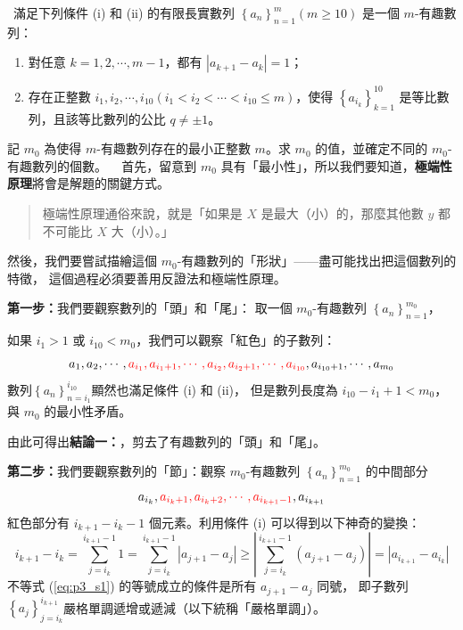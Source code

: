 \documentclass{article}
\newcommand{\INDEX}[1]{\fbox{\textbf{#1}}\ }
\begin{document}
\newpage
\INDEX{問題3}滿足下列條件 (i) 和 (ii) 的有限長實數列 $\left\{a_n\right\}_{n=1}^{m}\left(m\geq10\right)$ 是一個 $m$-有趣數列：
\begin{enumerate}[label = (\roman*)]
  \item 對任意 $k=1,2,\cdots,m-1$，都有 $\left|a_{k+1}-a_k\right|=1$；
  \item 存在正整數 $i_1,i_2,\cdots,i_{10}\left(i_1<i_2<\cdots<i_{10}\leq m\right)$，使得 $\left\{a_{i_k}\right\}_{k=1}^{10}$ 是等比數列，且該等比數列的公比 $q\neq\pm1$。
\end{enumerate}
記 $m_0$ 為使得 $m$-有趣數列存在的最小正整數 $m$。求 $m_0$ 的值，並確定不同的 $m_0$-有趣數列的個數。
\newpage
\INDEX{證明：}\setcounter{equation}{0}
首先，留意到 $m_0$ 具有「最小性」，所以我們要知道，\textbf{極端性原理}將會是解題的關鍵方式。
\begin{quotation}
  極端性原理通俗來說，就是「如果是 $X$ 是最大（小）的，那麼其他數 $y$ 都不可能比 $X$ 大（小）。」
\end{quotation}
然後，我們要嘗試描繪這個 $m_0$-有趣數列的「形狀」——盡可能找出把這個數列的特徵，
這個過程必須要善用反證法和極端性原理。

\textbf{第一步：}我們要觀察數列的「頭」和「尾」：
取一個 $m_0$-有趣數列 $\left\{a_n\right\}_{n=1}^{m_0}$，

如果 $i_1>1$ 或 $i_{10}<m_0$，我們可以觀察「紅色」的子數列： 
\begin{equation*}
  a_1,a_2,\cdots,\color{red}{a_{i_1},a_{i_1+1},\cdots,a_{i_2},a_{i_2+1},\cdots,a_{i_{10}}}\color{black}{,a_{i_{10}+1},\cdots,a_{m_0}}
\end{equation*}
數列$\left\{a_n\right\}_{n=i_1}^{i_{10}}$顯然也滿足條件 (i) 和 (ii)，
但是數列長度為 $i_{10}-i_1+1<m_0$，與 $m_0$ 的最小性矛盾。

由此可得出\textbf{結論一：}，剪去了有趣數列的「頭」和「尾」。

\textbf{第二步：}我們要觀察數列的「節」：觀察 $m_0$-有趣數列 $\left\{a_n\right\}_{n=1}^{m_0}$ 的中間部分
$$
  a_{i_k},\color{red}{a_{i_k+1},a_{i_k+2},\cdots,a_{i_{k+1}-1}}\color{black}{,a_{i_{k+1}}}
$$
紅色部分有 $i_{k+1}-i_k-1$ 個元素。利用條件 (i) 可以得到以下神奇的變換：
\begin{equation}
  i_{k+1}-i_k=\sum_{j=i_k}^{i_{k+1}-1}{1}=\sum_{j=i_k}^{i_{k+1}-1}{\left|a_{j+1}-a_j\right|}\geq\left|\sum_{j=i_k}^{i_{k+1}-1}{\left(a_{j+1}-a_j\right)}\right|=|a_{i_{k+1}}-a_{i_k}|\label{eq:p3_s1}
\end{equation}
不等式 (\ref{eq:p3_s1}) 的等號成立的條件是所有 $a_{j+1}-a_j$ 同號，
即子數列$\left\{a_j\right\}_{j=i_k}^{i_{k+1}}$嚴格單調遞增或遞減（以下統稱「嚴格單調」）。
\end{document}
